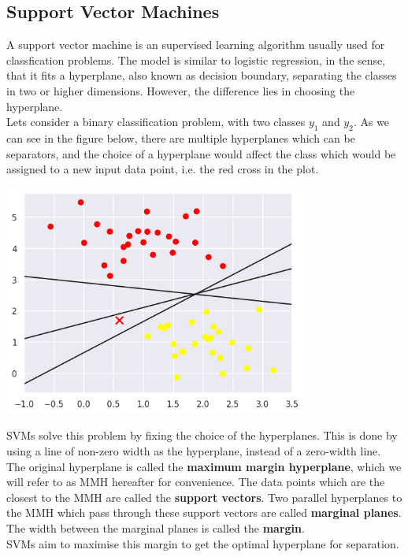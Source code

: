\documentclass[12pt]{article}
\begin{document}
\subsection{Support Vector Machines}
A support vector machine is an supervised learning algorithm usually used for classfication problems. The model is similar to logistic regression, in the sense, that it fits a hyperplane, also known as decision boundary, separating the classes in two or higher dimensions. However, the difference lies in choosing the hyperplane.\\
Lets consider a binary classification problem, with two classes $y_1$ and $y_2$. As we can see in the figure below, there are multiple hyperplanes which can be separators, and the choice of a hyperplane would affect the class which would be assigned to a new input data point, i.e. the red cross in the plot.\\
\begin{center}
    \includegraphics[width=10cm]{svm-possible-hp.png}
\end{center}
SVMs solve this problem by fixing the choice of the hyperplanes. This is done by using a line of non-zero width as the hyperplane, instead of a zero-width line.\\
The original hyperplane is called the \textbf{maximum margin hyperplane}, which we will refer to as MMH hereafter for convenience.
The data points which are the closest to the MMH are called the \textbf{support vectors}. Two parallel hyperplanes to the MMH which pass through these support vectors are called \textbf{marginal planes}. The width between the marginal planes is called the \textbf{margin}.\\
SVMs aim to maximise this margin to get the optimal hyperplane for separation.
\end{document}
